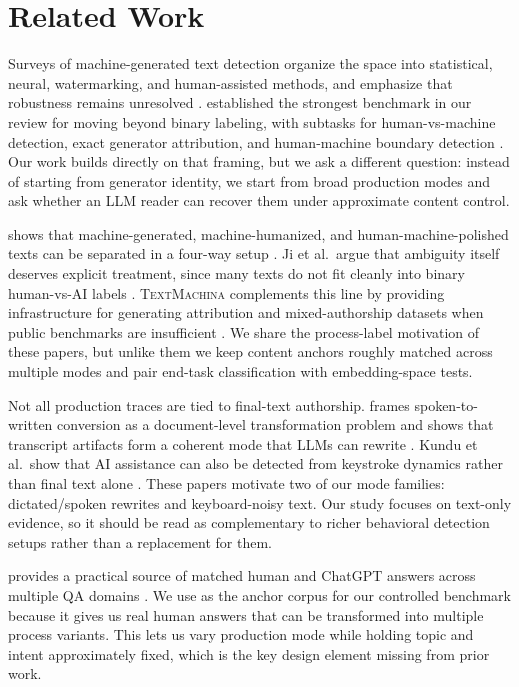 \section{Related Work}
\label{sec:related_work}

 Surveys of machine-generated text detection organize the space into statistical, neural, watermarking, and human-assisted methods, and emphasize that robustness remains unresolved \cite{wu2023survey}. \semeval established the strongest benchmark in our review for moving beyond binary labeling, with subtasks for human-vs-machine detection, exact generator attribution, and human-machine boundary detection \cite{wang2024semeval}. Our work builds directly on that framing, but we ask a different question: instead of starting from generator identity, we start from broad production modes and ask whether an LLM reader can recover them under approximate content control.

 \llmdetectaive shows that machine-generated, machine-humanized, and human-machine-polished texts can be separated in a four-way setup \cite{abassy2024llmdetectaive}. Ji et al.\ argue that ambiguity itself deserves explicit treatment, since many texts do not fit cleanly into binary human-vs-AI labels \cite{ji2024notjust}. \textsc{TextMachina} complements this line by providing infrastructure for generating attribution and mixed-authorship datasets when public benchmarks are insufficient \cite{sarvazyan2024textmachina}. We share the process-label motivation of these papers, but unlike them we keep content anchors roughly matched across multiple modes and pair end-task classification with embedding-space tests.

 Not all production traces are tied to final-text authorship. \swab frames spoken-to-written conversion as a document-level transformation problem and shows that transcript artifacts form a coherent mode that LLMs can rewrite \cite{liu2024recording}. Kundu et al.\ show that AI assistance can also be detected from keystroke dynamics rather than final text alone \cite{kundu2024keystroke}. These papers motivate two of our mode families: dictated/spoken rewrites and keyboard-noisy text. Our study focuses on text-only evidence, so it should be read as complementary to richer behavioral detection setups rather than a replacement for them.

 \hcthree provides a practical source of matched human and ChatGPT answers across multiple QA domains \cite{guo2023hc3}. We use \hcthree as the anchor corpus for our controlled benchmark because it gives us real human answers that can be transformed into multiple process variants. This lets us vary production mode while holding topic and intent approximately fixed, which is the key design element missing from prior work.
